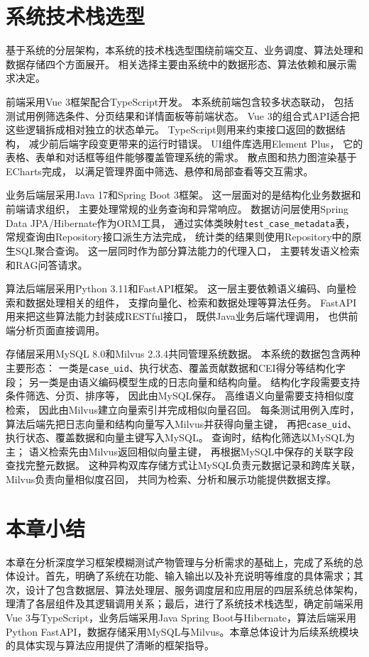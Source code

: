 \section{系统技术栈选型}
\label{sec:tech_stack}

基于系统的分层架构，本系统的技术栈选型围绕前端交互、业务调度、算法处理和数据存储四个方面展开。
相关选择主要由系统中的数据形态、算法依赖和展示需求决定。

前端采用Vue 3框架配合TypeScript开发。
本系统前端包含较多状态联动，
包括测试用例筛选条件、分页结果和详情面板等前端状态。
Vue 3的组合式API适合把这些逻辑拆成相对独立的状态单元。
TypeScript则用来约束接口返回的数据结构，
减少前后端字段变更带来的运行时错误。
UI组件库选用Element Plus，
它的表格、表单和对话框等组件能够覆盖管理系统的需求。
散点图和热力图渲染基于ECharts完成，
以满足管理界面中筛选、悬停和局部查看等交互需求。

业务后端层采用Java 17和Spring Boot 3框架。
这一层面对的是结构化业务数据和前端请求组织，
主要处理常规的业务查询和异常响应。
数据访问层使用Spring Data JPA/Hibernate作为ORM工具，
通过实体类映射\texttt{test\_case\_metadata}表，
常规查询由Repository接口派生方法完成，
统计类的结果则使用Repository中的原生SQL聚合查询。
这一层同时作为部分算法能力的代理入口，
主要转发语义检索和RAG问答请求。

算法后端层采用Python 3.11和FastAPI框架。
这一层主要依赖语义编码、向量检索和数据处理相关的组件，
支撑向量化、检索和数据处理等算法任务。
FastAPI用来把这些算法能力封装成RESTful接口，
既供Java业务后端代理调用，
也供前端分析页面直接调用。

存储层采用MySQL 8.0和Milvus 2.3.4共同管理系统数据。
本系统的数据包含两种主要形态：
一类是\texttt{case\_uid}、执行状态、覆盖贡献数据和CEI得分等结构化字段；
另一类是由语义编码模型生成的日志向量和结构向量。
结构化字段需要支持条件筛选、分页、排序等，
因此由MySQL保存。
高维语义向量需要支持相似度检索，
因此由Milvus建立向量索引并完成相似向量召回。
每条测试用例入库时，
算法后端先把日志向量和结构向量写入Milvus并获得向量主键，
再把\texttt{case\_uid}、执行状态、覆盖数据和向量主键写入MySQL。
查询时，结构化筛选以MySQL为主；
语义检索先由Milvus返回相似向量主键，
再根据MySQL中保存的关联字段查找完整元数据。
这种异构双库存储方式让MySQL负责元数据记录和跨库关联，
Milvus负责向量相似度召回，
共同为检索、分析和展示功能提供数据支撑。

\section{本章小结}

本章在分析深度学习框架模糊测试产物管理与分析需求的基础上，完成了系统的总体设计。首先，明确了系统在功能、输入输出以及补充说明等维度的具体需求；其次，设计了包含数据层、算法处理层、服务调度层和应用层的四层系统总体架构，理清了各层组件及其逻辑调用关系；最后，进行了系统技术栈选型，确定前端采用Vue 3与TypeScript，业务后端采用Java Spring Boot与Hibernate，算法后端采用Python FastAPI，数据存储采用MySQL与Milvus。本章总体设计为后续系统模块的具体实现与算法应用提供了清晰的框架指导。


